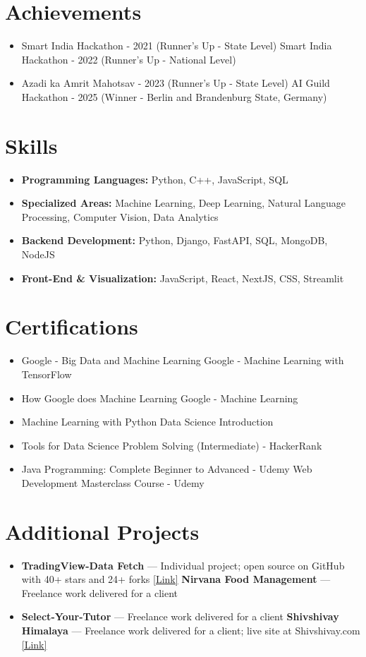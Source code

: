 \documentclass[a4paper,10pt]{article}
\begin{document}
\section*{Achievements}
\begin{itemize}
\item Smart India Hackathon - 2021 (Runner's Up - State Level) \hfill Smart India Hackathon - 2022 (Runner's Up - National Level)
\item Azadi ka Amrit Mahotsav - 2023 (Runner's Up - State Level) \hfill AI Guild Hackathon - 2025 (Winner - Berlin and Brandenburg State, Germany)
\end{itemize}

\section*{Skills}
\begin{itemize}
  \item \textbf{Programming Languages:} Python, C++, JavaScript, SQL
  \item \textbf{Specialized Areas:} Machine Learning, Deep Learning, Natural Language Processing, Computer Vision, Data Analytics
  \item \textbf{Backend Development:} Python, Django, FastAPI, SQL, MongoDB, NodeJS
  \item \textbf{Front-End \& Visualization:} JavaScript, React, NextJS, CSS, Streamlit
\end{itemize}

\section*{Certifications}
\begin{itemize}
\item Google - Big Data and Machine Learning \hfill Google - Machine Learning with TensorFlow
\item How Google does Machine Learning \hfill Google - Machine Learning
\item Machine Learning with Python \hfill Data Science Introduction
\item Tools for Data Science \hfill Problem Solving (Intermediate) - HackerRank
\item Java Programming: Complete Beginner to Advanced - Udemy \hfill Web Development Masterclass Course - Udemy
\end{itemize}

\section*{Additional Projects}
\begin{itemize}
\item \textbf{TradingView-Data Fetch} — Individual project; open source on GitHub with 40+ stars and 24+ forks \href{https://github.com/ravalmeet/TradingView}{[Link]} \hfill \textbf{Nirvana Food Management} — Freelance work delivered for a client
\item \textbf{Select-Your-Tutor} — Freelance work delivered for a client \hfill \textbf{Shivshivay Himalaya} — Freelance work delivered for a client; live site at Shivshivay.com \href{Shivshivay.com}{[Link]}
\end{itemize}
\end{document}
